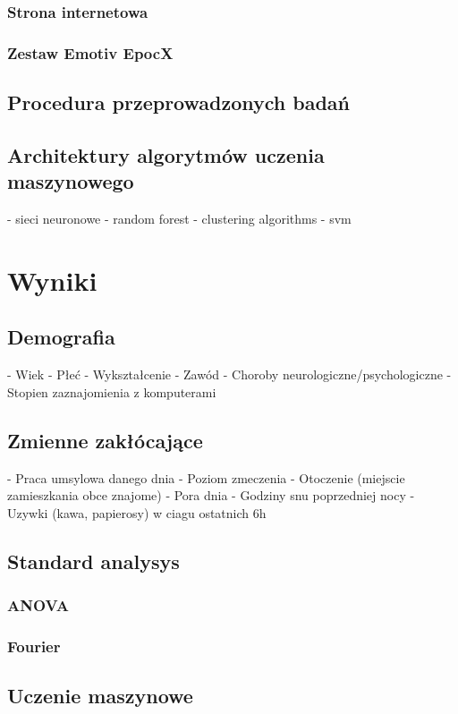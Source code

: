 \documentclass{./assets/wfis}
\begin{document}
\subsection{Strona internetowa}
\subsection{Zestaw Emotiv EpocX}\label{emotiv}

\section{Procedura przeprowadzonych badań}\label{procedura-badan}
\section{Architektury algorytmów uczenia maszynowego}
- sieci neuronowe
- random forest
- clustering algorithms
- svm

\chapter{Wyniki}
\section{Demografia}
- Wiek
- Płeć
- Wykształcenie
- Zawód
- Choroby neurologiczne/psychologiczne
- Stopien zaznajomienia z komputerami
\section{Zmienne zakłócające}\label{zmiennne-zaklucajace}
- Praca umsylowa danego dnia
- Poziom zmeczenia
- Otoczenie (miejscie zamieszkania obce znajome)
- Pora dnia
- Godziny snu poprzedniej nocy
- Uzywki (kawa, papierosy) w ciagu ostatnich 6h
\section{Standard analysys}\label{analiza-klasyczna}
\subsection{ANOVA}
\subsection{Fourier}
\section{Uczenie maszynowe}\label{uczenie-maszynowe}
\end{document}

